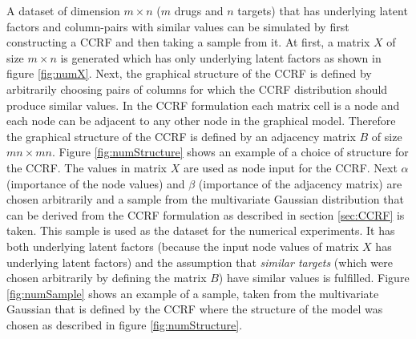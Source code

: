 A dataset of dimension $m \times n$ ($m$ drugs and $n$ targets) that has underlying latent factors and column-pairs with similar values can be simulated by first constructing a CCRF and then taking a sample from it. At first, a matrix $X$ of size $m \times n$ is generated which has only underlying latent factors as shown in figure \ref{fig:numX}. Next, the graphical structure of the CCRF is defined by arbitrarily choosing pairs of columns for which the CCRF distribution should produce similar values. In the CCRF formulation each matrix cell is a node and each node can be adjacent to any other node in the graphical model. Therefore the graphical structure of the CCRF is defined by an adjacency matrix $B$ of size $mn \times mn$. Figure \ref{fig:numStructure} shows an example of a choice of structure for the CCRF.  The values in matrix $X$ are used as node input for the CCRF. Next $\alpha$ (importance of the node values) and $\beta$ (importance of the adjacency matrix) are chosen arbitrarily and a sample from the multivariate Gaussian distribution that can be derived from the CCRF formulation as described in section \ref{sec:CCRF} is taken. This sample is used as the dataset for the numerical experiments. It has both underlying latent factors (because the input node values of matrix $X$ has underlying latent factors) and the assumption that \textit{similar targets} (which were chosen arbitrarily by defining the matrix $B$) have similar values is fulfilled. Figure \ref{fig:numSample} shows an example of a sample, taken from the multivariate Gaussian that is defined by the CCRF where the structure of the model was chosen as described in figure \ref{fig:numStructure}.

